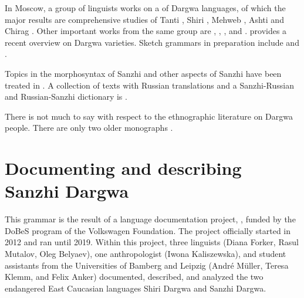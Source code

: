 In Moscow, a group of linguists works on a  of Dargwa languages, of which the major results are comprehensive studies of Tanti \citep{Sumbatova.Lander2014}, Shiri \citep{BelyaevInPreparation}, Mehweb \citep{DanielMehweb}, Ashti \citep{Belyaev2012} and Chirag \citep{GanenkovChiragSketch}. Other important works from the same group are \citet{Kalinina.Sumbatova2007}, \citet{Sumbatova2009, Sumbatova2010, Sumbatova2011, Sumbatova2013}, \citet{Lander2008, Lander2010}, and \citet{Serdobolskaya2009, Serdobolskaya2010}. \citet{SumbatovaInPreparation} provides a recent overview on Dargwa varieties. Sketch grammars in preparation include \citet{GanenkovChiragSketch} and \citet{ForkerSanzhiSketch}.

Topics in the morphosyntax of Sanzhi and other aspects of Sanzhi have been treated in \citet{Forker2016a, Forker2014, Forker2019, ForkerSubmitteda, ForkerSubmittedb, ForkerSubmittedc}. A collection of texts with Russian translations and a Sanzhi-Russian and Russian-Sanzhi dictionary is \citet{Forker.Gadzhimuradov2017}.

There is not much to say with respect to the ethnographic literature on Dargwa people. There are only two older monographs \citep{Schilling1949, Gadzieva.etal1967}.



\section{Documenting and describing Sanzhi Dargwa}
\label{sec:Documenting and describing Sanzhi Dargwa}

This grammar is the result of a language documentation project, , funded by the DoBeS program of the Volkswagen Foundation. The project officially started in 2012 and ran until 2019. Within this project, three linguists (Diana Forker, Rasul Mutalov, Oleg Belyaev), one anthropologist (Iwona Kaliszewska), and student assistants from the Universities of Bamberg and Leipzig (André M{\"u}ller, Teresa Klemm, and Felix Anker) documented, described, and analyzed the two endangered East Caucasian languages Shiri Dargwa and Sanzhi Dargwa.

